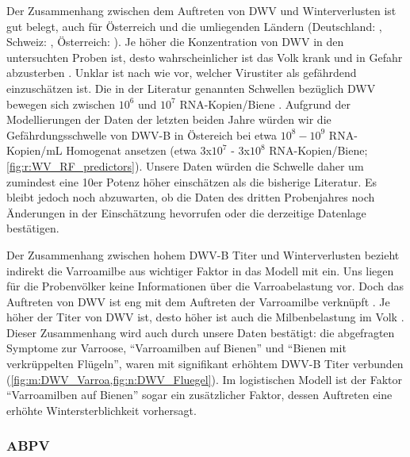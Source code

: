 Der Zusammenhang zwischen dem Auftreten von DWV und Winterverlusten ist gut belegt, auch für Österreich und die umliegenden Ländern (Deutschland: \cite{genersch2010}, Schweiz: \cite{dainat2012}, Österreich: \cite{morawetz2018}). Je höher die Konzentration von DWV in den untersuchten Proben ist, desto wahrscheinlicher ist das Volk krank und in Gefahr abzusterben \citep{amiri2015,berthoud2010,barroso-arevalo2019,dainat2012}. Unklar ist nach wie vor, welcher Virustiter als gefährdend einzuschätzen ist. Die in der Literatur genannten Schwellen bezüglich DWV bewegen sich zwischen $10^6$ und $10^7$ RNA-Kopien/Biene \citep{amiri2015,barroso-arevalo2019,möckel2011,schurr2019}. Aufgrund der Modellierungen der Daten der letzten beiden Jahre würden wir die Gefährdungsschwelle von DWV-B in Östereich bei etwa $10^8 - 10^9$ RNA-Kopien/\si{\milli\liter} Homogenat ansetzen (etwa 3x$10^7$ - 3x$10^8$ RNA-Kopien/Biene; \cref{fig:r:WV_RF_predictors}). Unsere Daten würden die Schwelle daher um zumindest eine 10er Potenz höher einschätzen als die bisherige Literatur. Es bleibt jedoch noch abzuwarten, ob die Daten des dritten Probenjahres noch Änderungen in der Einschätzung hevorrufen oder die derzeitige Datenlage bestätigen.

Der Zusammenhang zwischen hohem DWV-B Titer und Winterverlusten bezieht indirekt die Varroamilbe aus wichtiger Faktor in das Modell mit ein. Uns liegen für die Probenvölker keine Informationen über die Varroabelastung vor. Doch das Auftreten von DWV ist eng mit dem Auftreten der Varroamilbe verknüpft \citep{bowen-walker1999,dainat2013,gisder2009}. Je höher der Titer von DWV ist, desto höher ist auch die Milbenbelastung im Volk \citep{barroso-arevalo2019}. Dieser Zusammenhang wird auch durch unsere Daten bestätigt:  die abgefragten Symptome zur Varroose, \enquote{Varroamilben auf Bienen} und \enquote{Bienen mit verkrüppelten Flügeln}, waren mit signifikant erhöhtem DWV-B Titer verbunden (\cref{fig:m:DWV_Varroa,fig:n:DWV_Fluegel}). Im logistischen Modell ist der Faktor \enquote{Varroamilben auf Bienen} sogar ein zusätzlicher Faktor, dessen Auftreten eine erhöhte Wintersterblichkeit vorhersagt.

\subsubsection{ABPV}

